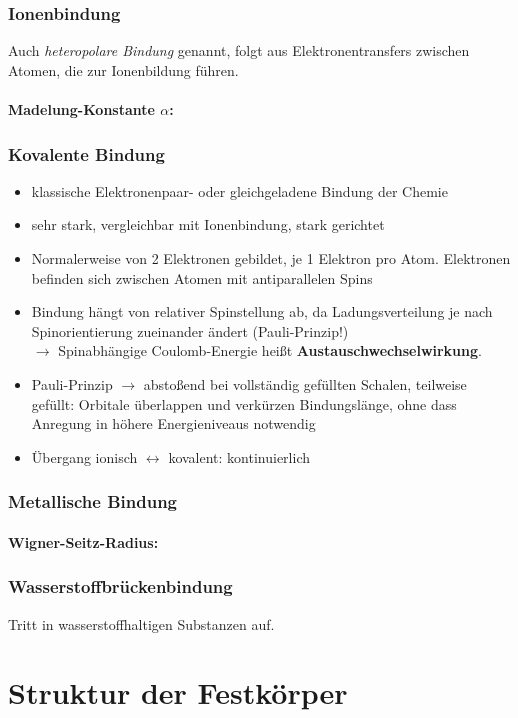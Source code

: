 \documentclass[a4paper,12pt]{article}
\begin{document}
\subsubsection{Ionenbindung}
Auch \emph{heteropolare Bindung} genannt, folgt aus Elektronentransfers zwischen Atomen, die zur Ionenbildung führen.
\paragraph*{Madelung-Konstante $ \alpha $:}
\subsubsection{Kovalente Bindung}
\begin{itemize}
	\item klassische Elektronenpaar- oder gleichgeladene Bindung der Chemie
	\item sehr stark, vergleichbar mit Ionenbindung, stark gerichtet
	\item Normalerweise von 2 Elektronen gebildet, je 1 Elektron pro Atom. Elektronen befinden sich zwischen Atomen mit antiparallelen Spins
	\item Bindung hängt von relativer Spinstellung ab, da Ladungsverteilung je nach Spinorientierung zueinander ändert (Pauli-Prinzip!)\\
	$ \rightarrow $ Spinabhängige Coulomb-Energie heißt \textbf{Austauschwechselwirkung}.
	\item Pauli-Prinzip $ \rightarrow $ abstoßend bei vollständig gefüllten Schalen, teilweise gefüllt: Orbitale überlappen und verkürzen Bindungslänge, ohne dass Anregung in höhere Energieniveaus notwendig 
	\item Übergang ionisch $ \leftrightarrow $ kovalent: kontinuierlich
\end{itemize}
\subsubsection{Metallische Bindung}
\paragraph*{Wigner-Seitz-Radius:}
\subsubsection{Wasserstoffbrückenbindung}
Tritt in wasserstoffhaltigen Substanzen auf.
\section{Struktur der Festkörper}
\end{document}

